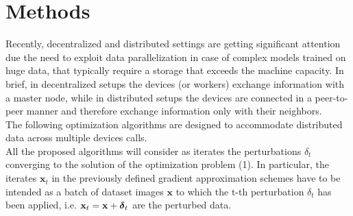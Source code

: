 \section{Methods}
Recently, decentralized and distributed settings are getting significant attention due the need to exploit data parallelization in case of complex models trained on huge data, that typically require a storage that exceeds the machine capacity. In brief, in decentralized setups the devices (or workers) exchange information with a master node, while in distributed setups the devices are connected in a peer-to-peer manner and therefore exchange information only with their neighbors. \\ 
The following optimization algorithms are designed to accommodate distributed data across multiple devices calls.\\
All the proposed algorithms will consider as iterates the perturbations \mbox{\boldmath$ \delta$}$_t$ converging to the solution of the optimization problem (1). In particular, the iterates $\mathbf{x}_t$ in the previously defined gradient approximation schemes have to be intended as a batch of dataset images $\mathbf{x}$ to which the t-th perturbation \mbox{\boldmath$ \delta$}$_t$ has been applied, i.e. $\mathbf{x}_t = \mathbf{x} + \mbox{\boldmath$ \delta$}_t$ are the perturbed data.